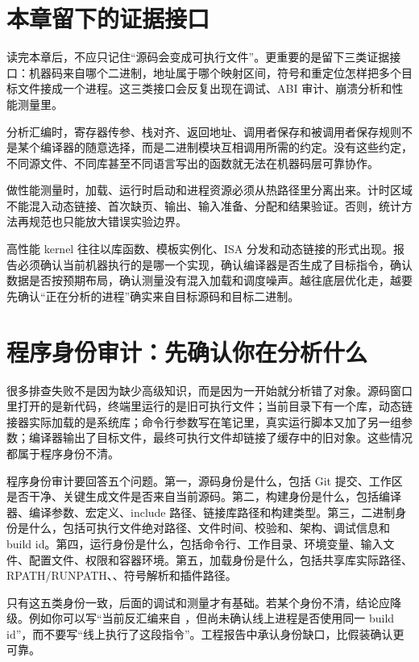 \section{本章留下的证据接口}

读完本章后，不应只记住“源码会变成可执行文件”。更重要的是留下三类证据接口：机器码来自哪个二进制，地址属于哪个映射区间，符号和重定位怎样把多个目标文件接成一个进程。这三类接口会反复出现在调试、ABI 审计、崩溃分析和性能测量里。

分析汇编时，寄存器传参、栈对齐、返回地址、调用者保存和被调用者保存规则不是某个编译器的随意选择，而是二进制模块互相调用所需的约定。没有这些约定，不同源文件、不同库甚至不同语言写出的函数就无法在机器码层可靠协作。

做性能测量时，加载、运行时启动和进程资源必须从热路径里分离出来。计时区域不能混入动态链接、首次缺页、输出、输入准备、分配和结果验证。否则，统计方法再规范也只能放大错误实验边界。

高性能 kernel 往往以库函数、模板实例化、ISA 分发和动态链接的形式出现。报告必须确认当前机器执行的是哪一个实现，确认编译器是否生成了目标指令，确认数据是否按预期布局，确认测量没有混入加载和调度噪声。越往底层优化走，越要先确认“正在分析的进程”确实来自目标源码和目标二进制。

\section{程序身份审计：先确认你在分析什么}

很多排查失败不是因为缺少高级知识，而是因为一开始就分析错了对象。源码窗口里打开的是新代码，终端里运行的是旧可执行文件；当前目录下有一个库，动态链接器实际加载的是系统库；命令行参数写在笔记里，真实运行脚本又加了另一组参数；编译器输出了目标文件，最终可执行文件却链接了缓存中的旧对象。这些情况都属于程序身份不清。

程序身份审计要回答五个问题。第一，源码身份是什么，包括 Git 提交、工作区是否干净、关键生成文件是否来自当前源码。第二，构建身份是什么，包括编译器、编译参数、宏定义、include 路径、链接库路径和构建类型。第三，二进制身份是什么，包括可执行文件绝对路径、文件时间、校验和、架构、调试信息和 build id。第四，运行身份是什么，包括命令行、工作目录、环境变量、输入文件、配置文件、权限和容器环境。第五，加载身份是什么，包括共享库实际路径、RPATH/RUNPATH、、符号解析和插件路径。

只有这五类身份一致，后面的调试和测量才有基础。若某个身份不清，结论应降级。例如你可以写“当前反汇编来自 ，但尚未确认线上进程是否使用同一 build id”，而不要写“线上执行了这段指令”。工程报告中承认身份缺口，比假装确认更可靠。

